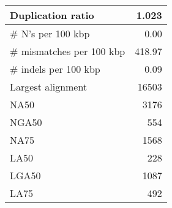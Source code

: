\documentclass[12pt,a4paper]{article}
\begin{document}
\begin{table}[ht]
\begin{center}
\begin{tabular}{|l*{1}{|r}|}
Duplication ratio & 1.023 \\ \hline
\# N's per 100 kbp & 0.00 \\ \hline
\# mismatches per 100 kbp & 418.97 \\ \hline
\# indels per 100 kbp & 0.09 \\ \hline
Largest alignment & 16503 \\ \hline
NA50 & 3176 \\ \hline
NGA50 & 554 \\ \hline
NA75 & 1568 \\ \hline
LA50 & 228 \\ \hline
LGA50 & 1087 \\ \hline
LA75 & 492 \\ \hline
\end{tabular}
\end{center}
\end{table}
\end{document}
